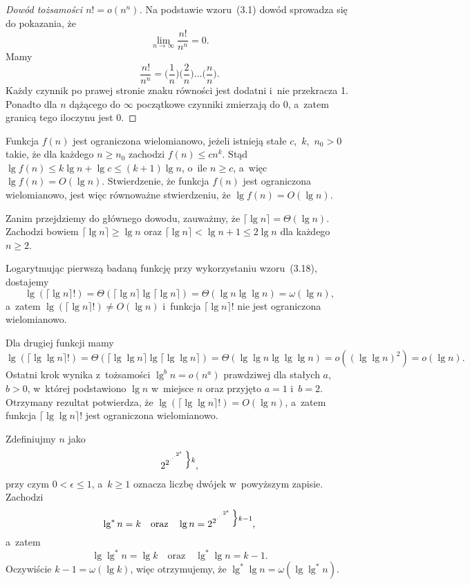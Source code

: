 \begin{proof}[Dowód tożsamości $n!=o(n^n)$]
	Na podstawie wzoru~(3.1) dowód sprowadza się do pokazania, że
	\[
		\lim_{n\to\infty}\frac{n!}{n^n} = 0.
	\]
	Mamy
	\[
	    \frac{n!}{n^n} = \biggl(\frac{1}{n}\biggr)\biggl(\frac{2}{n}\biggr)\dots\biggl(\frac{n}{n}\biggr).
	\]
	Każdy czynnik po prawej stronie znaku równości jest dodatni i~nie przekracza 1. Ponadto dla $n$ dążącego do $\infty$ początkowe czynniki zmierzają do 0, a~zatem granicą tego iloczynu jest 0.
\end{proof}

\exercise %
Funkcja $f(n)$ jest ograniczona wielomianowo, jeżeli istnieją stałe $c$,~$k$,~$n_0>0$ takie, że dla każdego $n\ge n_0$ zachodzi $f(n)\le cn^k$. Stąd $\lg f(n)\le k\lg n+\lg c\le(k+1)\lg n$, o~ile $n\ge c$, a~więc $\lg f(n)=O(\lg n)$. Stwierdzenie, że funkcja $f(n)$ jest ograniczona wielomianowo, jest więc równoważne stwierdzeniu, że $\lg f(n)=O(\lg n)$.

Zanim przejdziemy do głównego dowodu, zauważmy, że $\lceil\lg n\rceil=\Theta(\lg n)$. Zachodzi bowiem $\lceil\lg n\rceil\ge\lg n$ oraz $\lceil\lg n\rceil<\lg n+1\le2\lg n$ dla każdego $n\ge2$.

Logarytmując pierwszą badaną funkcję przy wykorzystaniu wzoru~(3.18), dostajemy
\[
	\lg(\lceil\lg n\rceil!) = \Theta(\lceil\lg n\rceil\lg\lceil\lg n\rceil) = \Theta(\lg n\lg\lg n) = \omega(\lg n),
\]
a~zatem $\lg(\lceil\lg n\rceil!)\ne O(\lg n)$ i~funkcja $\lceil\lg n\rceil!$ nie jest ograniczona wielomianowo.

Dla drugiej funkcji mamy
\[
	\lg(\lceil\lg\lg n\rceil!) = \Theta(\lceil\lg\lg n\rceil\lg\lceil\lg\lg n\rceil) = \Theta(\lg\lg n\lg\lg\lg n) = o((\lg\lg n)^2) = o(\lg n).
\]
Ostatni krok wynika z~tożsamości $\lg^bn=o(n^a)$ prawdziwej dla stałych $a$,~$b>0$, w~której podstawiono $\lg n$ w~miejsce $n$ oraz przyjęto $a=1$ i~$b=2$. Otrzymany rezultat potwierdza, że $\lg(\lceil\lg\lg n\rceil!)=O(\lg n)$, a~zatem funkcja $\lceil\lg\lg n\rceil!$ jest ograniczona wielomianowo.

\exercise %
Zdefiniujmy $n$ jako
\[
    2^{2^{\cdot^{\cdot^{\cdot^{2^\epsilon}}}}}\vbox{\hbox{$\Big\}\scriptstyle k$}\kern0pt},
\]
przy czym $0<\epsilon\le1$, a~$k\ge1$ oznacza liczbę dwójek w~powyższym zapisie. Zachodzi
\[
    \lg^*n=k \quad\text{oraz}\quad \lg n = 2^{2^{\cdot^{\cdot^{\cdot^{2^\epsilon}}}}}\vbox{\hbox{$\Big\}\scriptstyle k-1$}\kern0pt},
\]
a~zatem
\[
    \lg\lg^*n = \lg k \quad\text{oraz}\quad \lg^*\lg n = k-1.
\]
Oczywiście $k-1=\omega(\lg k)$, więc otrzymujemy, że $\lg^*\lg n=\omega(\lg\lg^*n)$.

